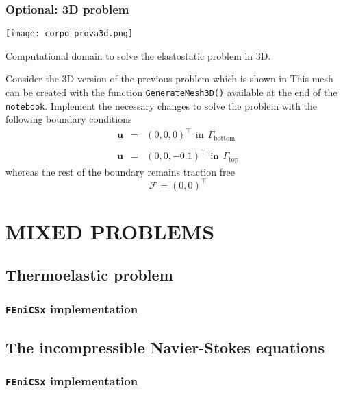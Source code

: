\subsection{Optional: 3D problem}
\begin{marginfigure}[-3.0cm]
	\texttt{[image: corpo\_prova3d.png]}
	\caption[]{Computational domain to solve the elastostatic problem in 3D.}
\end{marginfigure}
Consider the 3D version of the previous problem which is shown
in 
This mesh can be created with the function \texttt{GenerateMesh3D()} available
at the end of the \texttt{notebook}. Implement the necessary changes to solve
the problem with the following boundary conditions
\begin{eqnarray}
\mathbf{u} & = & (0,0,0)^{\intercal} ~~\mbox{in}~~\Gamma_{\mbox{bottom}} \nonumber \\
& & \nonumber \\
\mathbf{u} & = & (0,0,-0.1)^{\intercal} ~~\mbox{in}~~\Gamma_{\mbox{top}} \nonumber
\end{eqnarray}
whereas the rest of the boundary remains traction free 
$$
\boldsymbol{\mathcal{F}} = (0,0)^{\intercal}
$$
\fi

\setchapterpreamble[u]{\margintoc}
\chapter{MIXED PROBLEMS}

\section{Thermoelastic problem}

\subsection{\texttt{FEniCSx} implementation}

\section{The incompressible Navier-Stokes equations}

\subsection{\texttt{FEniCSx} implementation}

\setchapterpreamble[u]{\margintoc}
